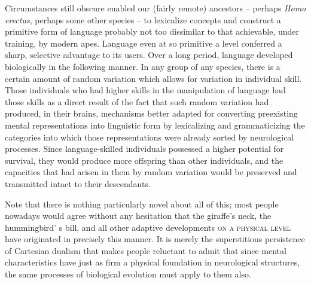 Circumstances still obscure enabled our (fairly remote) ancestors -- perhaps \textit{Homo erectus}, perhaps some other species -- to lexicalize concepts and construct a primitive form of language probably not too dissimilar to that achievable, under training, by modern apes. Language even at so primitive a level conferred a sharp, selective advantage to its users. Over a long period, language developed biologically in the following manner. In any group of any species, there is a certain amount of random variation which allows for variation in individual skill. Those individuals who had higher skills in the manipulation of language had those skills as a direct result of the fact that such random variation had produced, in their brains, mechanisms better adapted for converting preexisting mental representations into linguistic form by lexicalizing and grammaticizing the categories into which those representations were already sorted by neurological processes. Since language-skilled individuals possessed a higher potential for survival, they would produce more offspring than other individuals, and the capacities that had arisen in them by random variation would be preserved and transmitted intact to their descendants.

Note that there is nothing particularly novel about all of this; most people nowadays would agree without any hesitation that the giraffe's neck, the hummingbird' s bill, and all other adaptive developments \textsc{on a physical level} have originated in precisely this manner. It is merely the superstitious persistence of Cartesian dualism that makes people reluctant to admit that since mental characteristics have just as firm a physical foundation in neurological structures, the same processes of biological evolution must apply to them also.

